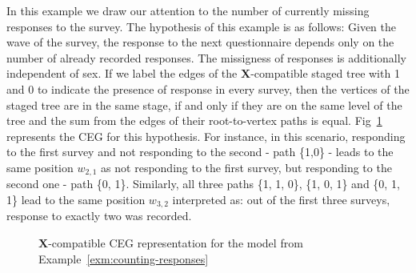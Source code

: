 \documentclass[runningheads]{llncs}
\begin{document}
\begin{example}
\label{exm:counting-responses}
In this example we draw our attention to the number of currently missing responses to the survey. The hypothesis of this example is as follows: Given the wave of the survey, the response to the next questionnaire depends only on the number of already recorded responses. The missigness of responses is additionally independent of sex. 
If we label the edges of the $\boldsymbol{X}$-compatible staged tree with 1 and 0 to indicate the presence of response in every survey, then the vertices of the staged tree are in the same stage, if and only if they are on the same level of the tree and the sum from the edges of their root-to-vertex paths is equal. Fig~\ref{ceg:counting-responses} represents the CEG for this hypothesis. For instance, in this scenario, responding to the first survey and not responding to the second - path \{1,0\} - leads to the same position $w_{2,1}$ as not responding to the first survey, but responding to the second one - path \{0, 1\}. Similarly, all three paths \{1, 1, 0\}, \{1, 0, 1\} and \{0, 1, 1\} lead to the same position $w_{3,2}$ interpreted as: out of the first three surveys, response to exactly two was recorded.
\end{example}
\begin{figure}
\centering

\vspace{1ex}
\caption{$\boldsymbol{X}$-compatible CEG representation for the  model from Example~\ref{exm:counting-responses}}
\label{ceg:counting-responses}
\end{figure}
\end{document}
